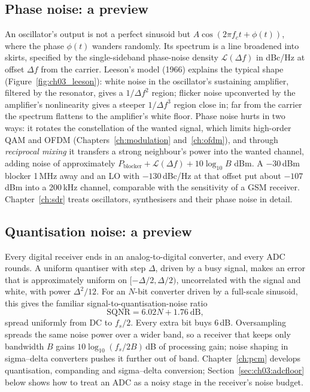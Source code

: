 
\subsection{Phase noise: a preview}

An oscillator's output is not a perfect sinusoid but $A\cos(2\pi f_ct+\phi(t))$, where the phase
$\phi(t)$ wanders randomly. Its spectrum is a line broadened into skirts, specified by the single-sideband
phase-noise density $\mathcal L(\Delta f)$ in dBc/Hz at offset $\Delta f$ from the carrier. Leeson's model
(1966) explains the typical shape (Figure~\ref{fig:ch03_leeson}): white noise in the oscillator's sustaining amplifier, filtered by the
resonator, gives a $1/\Delta f^2$ region; flicker noise upconverted by the amplifier's nonlinearity gives
a steeper $1/\Delta f^3$ region close in; far from the carrier the spectrum flattens to the amplifier's
white floor. Phase noise hurts in two ways: it rotates the constellation of the wanted signal, which
limits high-order QAM and OFDM (Chapters~\ref{ch:modulation} and~\ref{ch:ofdm}), and through
\emph{reciprocal mixing} it transfers a strong neighbour's power into the wanted channel, adding noise of
approximately $P_{\text{blocker}}+\mathcal L(\Delta f)+10\log_{10}B$ dBm. A $-30$\,dBm blocker 1\,MHz away
and an LO with $-130$\,dBc/Hz at that offset put about $-107$\,dBm into a 200\,kHz channel, comparable
with the sensitivity of a GSM receiver. Chapter~\ref{ch:sdr} treats oscillators, synthesisers and their
phase noise in detail.

\subsection{Quantisation noise: a preview}

Every digital receiver ends in an analog-to-digital converter, and every ADC rounds. A uniform quantiser
with step $\Delta$, driven by a busy signal, makes an error that is approximately uniform on
$[-\Delta/2,\Delta/2)$, uncorrelated with the signal and white, with power $\Delta^2/12$. For an $N$-bit
converter driven by a full-scale sinusoid, this gives the familiar signal-to-quantisation-noise ratio
\begin{equation}
\mathrm{SQNR}=6.02N+1.76\ \mathrm{dB},
\label{eq:ch03:sqnr}
\end{equation}
spread uniformly from DC to $f_s/2$. Every extra bit buys 6\,dB. Oversampling spreads the same noise
power over a wider band, so a receiver that keeps only bandwidth $B$ gains $10\log_{10}(f_s/2B)$\,dB of
processing gain; noise shaping in sigma--delta converters pushes it further out of band.
Chapter~\ref{ch:pcm} develops quantisation, companding and sigma--delta conversion;
Section~\ref{sec:ch03:adcfloor} below shows how to treat an ADC as a noisy stage in the receiver's noise
budget.

